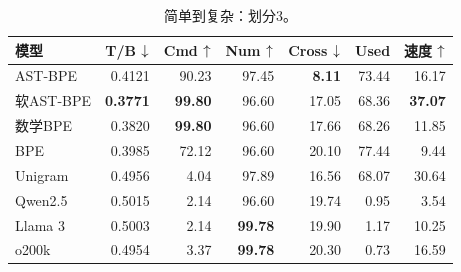\begin{table}[H]
\centering\small\renewcommand{\arraystretch}{1.05}
\caption{简单到复杂：划分3。}\label{tab:detail11}
\begin{tabular}{lrrrrrr}\toprule
模型&T/B $\downarrow$&Cmd $\uparrow$&Num $\uparrow$&Cross $\downarrow$&Used&速度 $\uparrow$\\\midrule
AST-BPE & 0.4121 & 90.23 & 97.45 & \textbf{8.11} & 73.44 & 16.17 \\
软AST-BPE & \textbf{0.3771} & \textbf{99.80} & 96.60 & 17.05 & 68.36 & \textbf{37.07} \\
数学BPE & 0.3820 & \textbf{99.80} & 96.60 & 17.66 & 68.26 & 11.85 \\
BPE & 0.3985 & 72.12 & 96.60 & 20.10 & 77.44 & 9.44 \\
Unigram & 0.4956 & 4.04 & 97.89 & 16.56 & 68.07 & 30.64 \\
\midrule
Qwen2.5 & 0.5015 & 2.14 & 96.60 & 19.74 & 0.95 & 3.54 \\
Llama 3 & 0.5003 & 2.14 & \textbf{99.78} & 19.90 & 1.17 & 10.25 \\
o200k & 0.4954 & 3.37 & \textbf{99.78} & 20.30 & 0.73 & 16.59 \\
\bottomrule\end{tabular}
\end{table}
